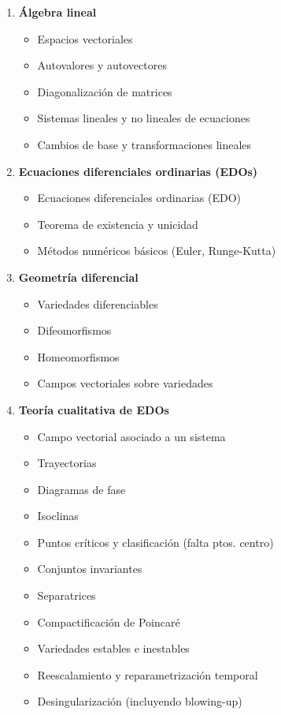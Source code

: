 \begin{enumerate}
	\item \textbf{Álgebra lineal}
	\begin{itemize}
		\item Espacios vectoriales
		\item Autovalores y autovectores \checkmark
		\item Diagonalización de matrices \checkmark
		\item Sistemas lineales y no lineales de ecuaciones \checkmark
		\item Cambios de base y transformaciones lineales
	\end{itemize}
	
	\item \textbf{Ecuaciones diferenciales ordinarias (EDOs)}
	\begin{itemize}
		\item Ecuaciones diferenciales ordinarias (EDO) \checkmark
		\item Teorema de existencia y unicidad \checkmark
		\item Métodos numéricos básicos (Euler, Runge-Kutta)
	\end{itemize}
	
	
	\item \textbf{Geometría diferencial}
	\begin{itemize}
		\item Variedades diferenciables
		\item Difeomorfismos
		\item Homeomorfismos
		\item Campos vectoriales sobre variedades
	\end{itemize}
	
	\item \textbf{Teoría cualitativa de EDOs}
	\begin{itemize}
		\item Campo vectorial asociado a un sistema \checkmark
		\item Trayectorias \checkmark
		\item Diagramas de fase \checkmark
		\item Isoclinas \checkmark
		\item Puntos críticos y clasificación \checkmark (falta ptos. centro)
		\item Conjuntos invariantes \checkmark
		\item Separatrices
		\item Compactificación de Poincaré
		\item Variedades estables e inestables
		\item Reescalamiento y reparametrización temporal
		\item Desingularización (incluyendo blowing-up)
	\end{itemize}
	

\end{enumerate}
